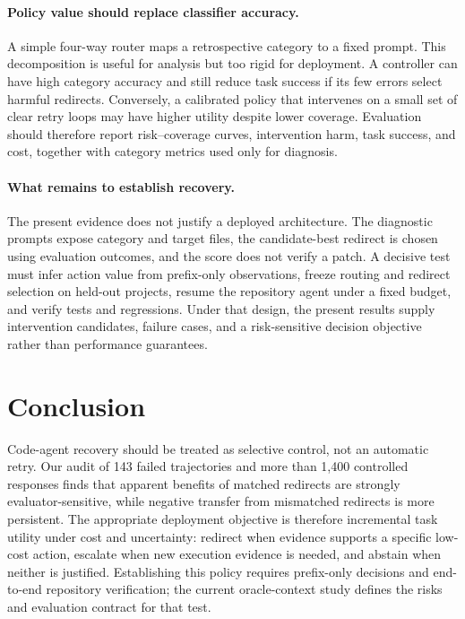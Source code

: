 \documentclass{article}
\begin{document}
\paragraph{Policy value should replace classifier accuracy.}
A simple four-way router maps a retrospective category to a fixed prompt.  This
decomposition is useful for analysis but too rigid for deployment.  A
controller can have high category accuracy and still reduce task success if its
few errors select harmful redirects.  Conversely, a calibrated policy that
intervenes on a small set of clear retry loops may have higher utility despite
lower coverage.  Evaluation should therefore report risk--coverage curves,
intervention harm, task success, and cost, together with category metrics used
only for diagnosis.

\paragraph{What remains to establish recovery.}
The present evidence does not justify a deployed architecture.  The diagnostic
prompts expose category and target files, the candidate-best redirect is chosen
using evaluation outcomes, and the score does not verify a patch.  A decisive
test must infer action value from prefix-only observations, freeze routing and
redirect selection on held-out projects, resume the repository agent under a
fixed budget, and verify tests and regressions.  Under that design, the present
results supply intervention candidates, failure cases, and a risk-sensitive
decision objective rather than performance guarantees.


\section{Conclusion}

Code-agent recovery should be treated as selective control, not an automatic
retry.  Our audit of 143 failed trajectories and more than 1,400 controlled
responses finds that apparent benefits of matched redirects are strongly
evaluator-sensitive, while negative transfer from mismatched redirects is more
persistent.  The appropriate deployment objective is therefore incremental
task utility under cost and uncertainty: redirect when evidence supports a
specific low-cost action, escalate when new execution evidence is needed, and
abstain when neither is justified.  Establishing this policy requires
prefix-only decisions and end-to-end repository verification; the current
oracle-context study defines the risks and evaluation contract for that test.
\end{document}
